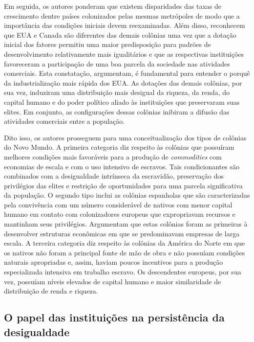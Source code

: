  Em seguida, os autores ponderam que existem disparidades das taxas de crescimento dentre países colonizados pelas mesmas metrópoles de modo que a importância das condições iniciais devem reexaminadas. Além disso, reconhecem que EUA e Canada são diferentes das demais colônias uma vez que a dotação inicial dos fatores permitiu uma maior predisposição para padrões de desenvolvimento relativamente mais igualitários e que as respectivas instituições favoreceram a participação de uma boa parcela da sociedade nas atividades comerciais. Esta constatação, argumentam, é fundamental para entender o porquê da industrialização mais rápida dos EUA. As dotações das demais colônias, por sua vez, induziram uma distribuição mais desigual da riqueza, da renda, do capital humano e do poder político aliado às instituições que preservaram suas elites. Em conjunto, as configurações dessas colônias inibiram a difusão das atividades comerciais entre a população.
 
 Dito isso, os autores prosseguem para uma conceitualização dos tipos de colônias do Novo Mundo. A primeira categoria diz respeito às colônias que possuíram melhores condições mais favoráveis para a produção de \textit{commodities} com economias de escala e com o uso intensivo de escravos. Tais condicionantes são combinados com a desigualdade intrínseca da escravidão, preservação dos privilégios das elites e restrição de oportunidades para uma parcela significativa da população. O segundo tipo inclui as colônias espanholas que são caracterizadas pela convivência com um número considerável de nativos com menor capital humano em contato com colonizadores europeus que expropriavam recursos e mantinham seus privilégios. Argumentam que estas colônias foram as primeiras à desenvolver estruturas econômicas em que se predominavam empresas de larga escala. A terceira categoria diz respeito às colônias da América do Norte em que os nativos não foram a principal fonte de mão de obra e não possuíam condições naturais apropriadas e, assim, haviam poucos incentivos para a produção especializada intensiva em trabalho escravo. Os descendentes europeus, por sua vez, possuíam níveis elevados de capital humano e maior similaridade de distribuição de renda e riqueza.
 
 \subsection*{O papel das instituições na persistência da desigualdade}
 
